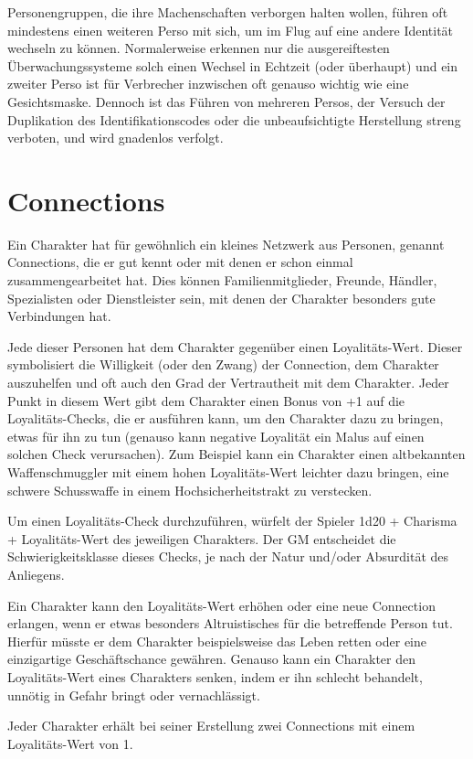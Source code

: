 Personengruppen, die ihre Machenschaften verborgen halten wollen, führen oft mindestens einen weiteren Perso mit sich, um im Flug auf eine andere Identität wechseln zu können. Normalerweise erkennen nur die ausgereiftesten Überwachungssysteme solch einen Wechsel in Echtzeit (oder überhaupt) und ein zweiter Perso ist für Verbrecher inzwischen oft genauso wichtig wie eine Gesichtsmaske. Dennoch ist das Führen von mehreren Persos, der Versuch der Duplikation des Identifikationscodes oder die unbeaufsichtigte Herstellung streng verboten, und wird gnadenlos verfolgt.
\section{Connections}
Ein Charakter hat für gewöhnlich ein kleines Netzwerk aus Personen, genannt Connections, die er gut kennt oder mit denen er schon einmal zusammengearbeitet hat. Dies können Familienmitglieder, Freunde, Händler, Spezialisten oder Dienstleister sein, mit denen der Charakter besonders gute Verbindungen hat.

Jede dieser Personen hat dem Charakter gegenüber einen Loyalitäts-Wert. Dieser symbolisiert die Willigkeit (oder den Zwang) der Connection, dem Charakter auszuhelfen und oft auch den Grad der Vertrautheit mit dem Charakter. Jeder Punkt in diesem Wert gibt dem Charakter einen Bonus von +1 auf die Loyalitäts-Checks, die er ausführen kann, um den Charakter dazu zu bringen, etwas für ihn zu tun (genauso kann negative Loyalität ein Malus auf einen solchen Check verursachen). Zum Beispiel kann ein Charakter einen altbekannten Waffenschmuggler mit einem hohen Loyalitäts-Wert leichter dazu bringen, eine schwere Schusswaffe in einem Hochsicherheitstrakt zu verstecken.

Um einen Loyalitäts-Check durchzuführen, würfelt der Spieler 1d20 + Charisma + Loyalitäts-Wert des jeweiligen Charakters. Der GM entscheidet die Schwierigkeitsklasse dieses Checks, je nach der Natur und/oder Absurdität des Anliegens.

Ein Charakter kann den Loyalitäts-Wert erhöhen oder eine neue Connection erlangen, wenn er etwas besonders Altruistisches für die betreffende Person tut. Hierfür müsste er dem Charakter beispielsweise das Leben retten oder eine einzigartige Geschäftschance gewähren.
Genauso kann ein Charakter den Loyalitäts-Wert eines Charakters senken, indem er ihn schlecht behandelt, unnötig in Gefahr bringt oder vernachlässigt.

Jeder Charakter erhält bei seiner Erstellung zwei Connections mit einem Loyalitäts-Wert von 1.
